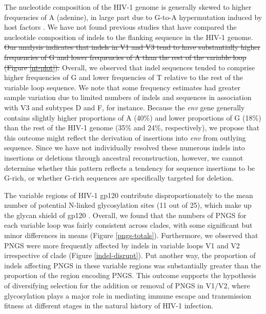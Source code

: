 \documentclass[12pt]{article}
\providecommand{\DIFdel}[1]{{\protect\color{red}\sout{#1}}}                      %
\providecommand{\DIFdelbegin}{} %
\providecommand{\DIFdelend}{} %
\newcommand{\DIFscaledelfig}{0.5}
\newlength{\DIFdelgraphicswidth} %
\newlength{\DIFdelgraphicsheight} %
\newcommand{\DIFdelincludegraphics}[2][]{%
\sbox{\DIFdelgraphicsbox}{\DIFOincludegraphics[#1]{#2}}%
\settoboxwidth{\DIFdelgraphicswidth}{\DIFdelgraphicsbox} %
\settoboxtotalheight{\DIFdelgraphicsheight}{\DIFdelgraphicsbox} %
\scalebox{\DIFscaledelfig}{%
\parbox[b]{\DIFdelgraphicswidth}{\usebox{\DIFdelgraphicsbox}\\[-\baselineskip] \rule{\DIFdelgraphicswidth}{0em}}\llap{\resizebox{\DIFdelgraphicswidth}{\DIFdelgraphicsheight}{%
\setlength{\unitlength}{\DIFdelgraphicswidth}%
\begin{picture}(1,1)%
\thicklines\linethickness{2pt} %
{\color[rgb]{1,0,0}\put(0,0){\framebox(1,1){}}}%
{\color[rgb]{1,0,0}\put(0,0){\line( 1,1){1}}}%
{\color[rgb]{1,0,0}\put(0,1){\line(1,-1){1}}}%
\end{picture}%
}\hspace*{3pt}}} %
} %
\DeclareRobustCommand{\DIFdelbegin}{\DIFOdelbegin \let\includegraphics\DIFdelincludegraphics} %
\DeclareRobustCommand{\DIFdelend}{\DIFOaddend \let\includegraphics\DIFOincludegraphics} %
\begin{document}
The nucleotide composition of the HIV-1 genome is generally skewed to higher frequencies of A (adenine), in large part due to G-to-A hypermutation induced by host factors \citep{Lidd2004apobec}.
We have not found previous studies that have compared the nucleotide composition of indels to the flanking sequence in the HIV-1 genome.
\DIFdelbegin \DIFdel{Our analysis indicates that indels in V1 and V3 tend to have substantially higher frequencies of G and lower frequencies of A than the rest of the variable loop (Figure \ref{nt-plot}).
}\DIFdelend %
Overall, we observed that indel sequences tended to comprise higher frequencies of G and lower frequencies of T relative to the rest of the variable loop sequence.
We note that some frequency estimates had greater sample variation due to limited numbers of indels and sequences in association with V3 and subtypes D and F, for instance.
Because the \textit{env} gene generally contains slightly higher proportions of A (40\%) and lower proportions of G (18\%) than the rest of the HIV-1 genome (35\% and 24\%, respectively), we propose that this outcome might reflect the derivation of insertions into \textit{env} from outlying sequence.
Since we have not individually resolved these numerous indels into insertions or deletions through ancestral reconstruction, however, we cannot determine whether this pattern reflects a tendency for sequence insertions to be G-rich, or whether G-rich sequences are specifically targeted for deletion.


The variable regions of HIV-1 gp120 contribute disproportionately to the mean number of potential N-linked glycosylation sites (11 out of 25), which make up the glycan shield of gp120 \citep{Zhu:2000}. 
Overall, we found that the numbers of PNGS for each variable loop was fairly consistent across clades, with some significant but minor differences in means (Figure \ref{pngs-totals}).
Furthermore, we observed that PNGS were more frequently affected by indels in variable loops V1 and V2 irrespective of clade (Figure \ref{indel-disrupt}).
Put another way, the proportion of indels affecting PNGS in these variable regions was substantially greater than the proportion of the region encoding PNGS.
This outcome supports the hypothesis of diversifying selection for the addition or removal of PNGS in V1/V2, where glycosylation plays a major role in mediating immune escape \citep{Sagar:2006} and transmission fitness \citep{Derdeyn:2004} at different stages in the natural history of HIV-1 infection.
\end{document}
